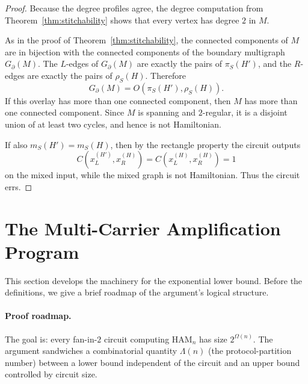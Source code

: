 \documentclass[11pt]{article}
\newcommand{\Ham}{\mathrm{HAM}}
\begin{document}
\begin{proof}
Because the degree profiles agree, the degree computation from
Theorem~\ref{thm:stitchability} shows that every vertex has degree $2$ in $M$.

As in the proof of Theorem~\ref{thm:stitchability}, the connected components of $M$ are in
bijection with the connected components of the boundary multigraph $G_\partial(M)$. The $L$-edges of
$G_\partial(M)$ are exactly the pairs of $\pi_S(H')$, and the $R$-edges are exactly the pairs of
$\rho_S(H)$. Therefore
\[
G_\partial(M)=O(\pi_S(H'),\rho_S(H)).
\]
If this overlay has more than one connected component, then $M$ has more than one connected component.
Since $M$ is spanning and $2$-regular, it is a disjoint union of at least two cycles, and hence is
not Hamiltonian.

If also $m_S(H')=m_S(H)$, then by the rectangle property the circuit outputs
\[
C(x^{(H')}_L,x^{(H)}_R)=C(x^{(H)}_L,x^{(H)}_R)=1
\]
on the mixed input, while the mixed graph is not Hamiltonian. Thus the circuit errs.
\end{proof}




\section{The Multi-Carrier Amplification Program}
\label{sec:sweep}

This section develops the machinery for the exponential lower bound.
Before the definitions, we give a brief roadmap of the argument's
logical structure.

\paragraph{Proof roadmap.}
The goal is: every fan-in-$2$ circuit computing $\Ham_n$ has size
$2^{\Omega(n)}$.  The argument sandwiches a combinatorial quantity
$\Lambda(n)$ (the protocol-partition number) between a lower bound
independent of the circuit and an upper bound controlled by circuit
size.
\end{document}
